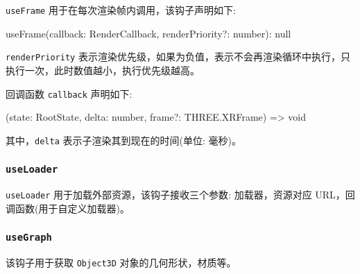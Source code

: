 \texttt{useFrame} 用于在每次渲染帧内调用，该钩子声明如下:

\begin{JavaScript}
useFrame(callback: RenderCallback, renderPriority?: number): null
\end{JavaScript}

\texttt{renderPriority} 表示渲染优先级，如果为负值，表示不会再渲染循环中执行，只执行一次，此时数值越小，执行优先级越高。

回调函数 \texttt{callback} 声明如下:

\begin{JavaScript}
(state: RootState, delta: number, frame?: THREE.XRFrame) => void
\end{JavaScript}

其中，\texttt{delta} 表示子渲染其到现在的时间(单位: 毫秒)。

\subsubsection*{\texttt{useLoader}}

\texttt{useLoader} 用于加载外部资源，该钩子接收三个参数: 加载器，资源对应 URL，回调函数(用于自定义加载器)。

\subsubsection*{\texttt{useGraph}}

该钩子用于获取 \texttt{Object3D} 对象的几何形状，材质等。